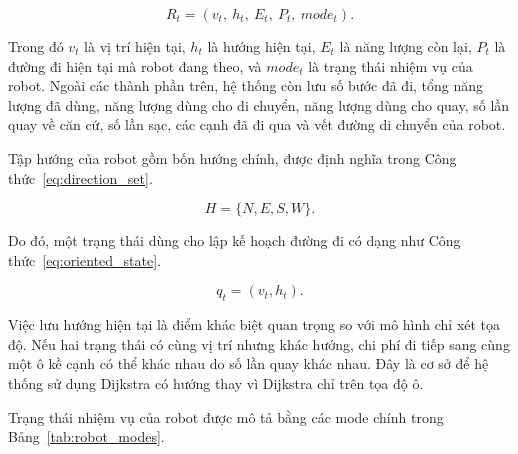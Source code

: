 \documentclass[../DoAn.tex]{subfiles}
\begin{document}
\begin{equation}
    R_t = (v_t,\ h_t,\ E_t,\ P_t,\ mode_t).
    \label{eq:robot_state_model}
\end{equation}

Trong đó $v_t$ là vị trí hiện tại, $h_t$ là hướng hiện tại, $E_t$ là năng lượng còn lại, $P_t$ là đường đi hiện tại mà robot đang theo, và $mode_t$ là trạng thái nhiệm vụ của robot. Ngoài các thành phần trên, hệ thống còn lưu số bước đã đi, tổng năng lượng đã dùng, năng lượng dùng cho di chuyển, năng lượng dùng cho quay, số lần quay về căn cứ, số lần sạc, các cạnh đã đi qua và vết đường di chuyển của robot.

Tập hướng của robot gồm bốn hướng chính, được định nghĩa trong Công thức~\ref{eq:direction_set}.

\begin{equation}
    H=\{N,E,S,W\}.
    \label{eq:direction_set}
\end{equation}

Do đó, một trạng thái dùng cho lập kế hoạch đường đi có dạng như Công thức~\ref{eq:oriented_state}.

\begin{equation}
    q_t=(v_t,h_t).
    \label{eq:oriented_state}
\end{equation}

Việc lưu hướng hiện tại là điểm khác biệt quan trọng so với mô hình chỉ xét tọa độ. Nếu hai trạng thái có cùng vị trí nhưng khác hướng, chi phí đi tiếp sang cùng một ô kề cạnh có thể khác nhau do số lần quay khác nhau. Đây là cơ sở để hệ thống sử dụng Dijkstra có hướng thay vì Dijkstra chỉ trên tọa độ ô.

Trạng thái nhiệm vụ của robot được mô tả bằng các mode chính trong Bảng~\ref{tab:robot_modes}.
\end{document}
